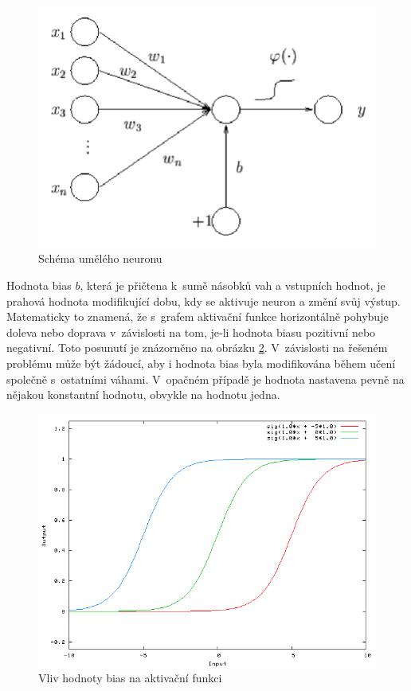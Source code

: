 \begin{figure}[H]
    \centering
    \includegraphics[scale=0.35]{obrazky-figures/perceptron.png}
    \caption{\label{fig:neuron}Schéma umělého neuronu}
\end{figure}

Hodnota bias $b$, která je přičtena k~sumě násobků vah a vstupních hodnot, je prahová hodnota modifikující dobu, kdy se aktivuje neuron a změní svůj výstup. Matematicky to znamená, že s~grafem aktivační funkce horizontálně pohybuje doleva nebo doprava v~závislosti na tom, je-li hodnota biasu pozitivní nebo negativní. Toto posunutí je znázorněno na obrázku \ref{fig:bias}. V~závislosti na řešeném problému může být žádoucí, aby i hodnota bias byla modifikována během učení společně s~ostatními váhami. V~opačném případě je hodnota nastavena pevně na nějakou konstantní hodnotu, obvykle na hodnotu jedna.

\begin{figure}[H]
    \centering
    \includegraphics[scale=0.4]{obrazky-figures/bias.png}
    \caption{\label{fig:bias}Vliv hodnoty bias na aktivační funkci}
\end{figure}





